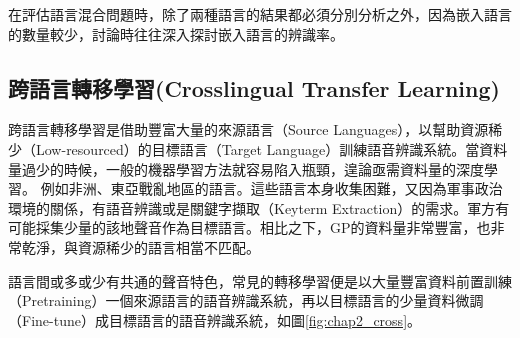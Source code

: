 在評估語言混合問題時，除了兩種語言的結果都必須分別分析之外，因為嵌入語言的數量較少，討論時往往深入探討嵌入語言的辨識率。


\subsection{跨語言轉移學習(Crosslingual Transfer Learning)}
跨語言轉移學習是借助豐富大量的來源語言（Source Languages），以幫助資源稀少（Low-resourced）的目標語言（Target Language）訓練語音辨識系統。當資料量過少的時候，一般的機器學習方法就容易陷入瓶頸，遑論亟需資料量的深度學習。
例如非洲、東亞戰亂地區的語言。這些語言本身收集困難，又因為軍事政治環境的關係，有語音辨識或是關鍵字擷取（Keyterm Extraction）的需求。軍方有可能採集少量的該地聲音作為目標語言。相比之下，GP的資料量非常豐富，也非常乾淨，與資源稀少的語言相當不匹配。

語言間或多或少有共通的聲音特色，常見的轉移學習便是以大量豐富資料前置訓練（Pretraining）一個來源語言的語音辨識系統，再以目標語言的少量資料微調（Fine-tune）成目標語言的語音辨識系統，如圖\ref{fig:chap2_cross}。

